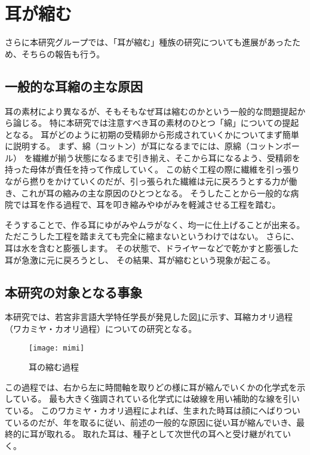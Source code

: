 \section{耳が縮む}
さらに本研究グループでは、「耳が縮む」種族の研究についても進展があったため、そちらの報告も行う。

\subsection{一般的な耳縮の主な原因}
耳の素材により異なるが、そもそもなぜ耳は縮むのかという一般的な問題提起から論じる。
特に本研究では注意すべき耳の素材のひとつ「綿」についての提起となる。
耳がどのように初期の受精卵から形成されていくかについてまず簡単に説明する。
まず、綿（コットン）が耳になるまでには、原綿（コットンボール） を繊維が揃う状態になるまで引き揃え、そこから耳になるよう、受精卵を持った母体が責任を持って作成していく。
この紡ぐ工程の際に繊維を引っ張りながら撚りをかけていくのだが、引っ張られた繊維は元に戻ろうとする力が働き、これが耳の縮みの主な原因のひとつとなる。
そうしたことから一般的な病院では耳を作る過程で、耳を叩き縮みやゆがみを軽減させる工程を踏む。\par

そうすることで、作る耳にゆがみやムラがなく、均一に仕上げることが出来る。
ただこうした工程を踏まえても完全に縮まないというわけではない。
さらに、耳は水を含むと膨張します。
その状態で、ドライヤーなどで乾かすと膨張した耳が急激に元に戻ろうとし、
その結果、耳が縮むという現象が起こる。

\subsection{本研究の対象となる事象}
本研究では、若宮非言語大学特任学長が発見した図\ref{mimi}に示す、耳縮カオリ過程（ワカミヤ・カオリ過程）についての研究となる。
\begin{figure}
\centering
\texttt{[image: mimi]}
\caption{耳の縮む過程}
\label{mimi}
\end{figure}
この過程では、右から左に時間軸を取りどの様に耳が縮んでいくかの化学式を示している。
最も大きく強調されている化学式には破線を用い補助的な線を引いている。
このワカミヤ・カオリ過程によれば、生まれた時耳は顔にへばりついているのだが、年を取るに従い、前述の一般的な原因に従い耳が縮んでいき、最終的に耳が取れる。
取れた耳は、種子として次世代の耳へと受け継がれていく。





